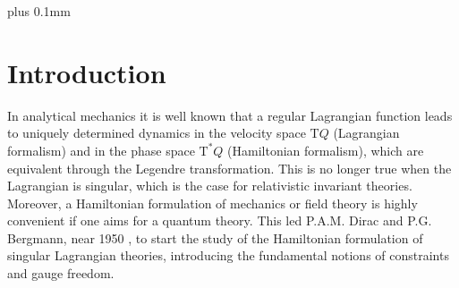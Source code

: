 \documentclass[11pt]{article}
\theoremstyle{plain}
\theoremstyle{definition}
\newcommand{\T}{{\mathrm T}}
\begin{document}


\newpage


{\setcounter{tocdepth}{2}
\def\baselinestretch{1}
\small
\def\addvspace#1{\vskip 1pt}
\parskip 0pt plus 0.1mm
\tableofcontents
}


\pagestyle{fancy}

\fancyhead[C]{}           %

\fancyfoot[L]{}     %
\fancyfoot[C]{\thepage}                  %
\fancyfoot[R]{}            %

\setlength{\headheight}{17pt}

\renewcommand{\headrulewidth}{0.1pt}  %
\renewcommand{\footrulewidth}{0pt}    %

\renewcommand{\headrule}{%
    \vspace{3pt}                %
    \hrule width\headwidth height 0.4pt %
    \vspace{0pt}                %
}

\setlength{\headsep}{30pt}  %


\section{Introduction}

In analytical mechanics it is well known that
a regular Lagrangian function leads to uniquely determined dynamics in the velocity space $\T Q$ (Lagrangian formalism)
and in the phase space $\T^*Q$ (Hamiltonian formalism),
which are equivalent through the Legendre transformation.
This is no longer true when the Lagrangian is singular,
which is the case for relativistic invariant theories.
Moreover, a Hamiltonian formulation of mechanics or field theory is highly convenient if one aims for a quantum theory. 
This led P.A.M. Dirac and P.G. Bergmann,
near 1950
\cite{Ber_51,Dir_50},
to start the study of the Hamiltonian formulation of singular Lagrangian theories,
introducing the fundamental notions of constraints and gauge freedom.
\end{document}
